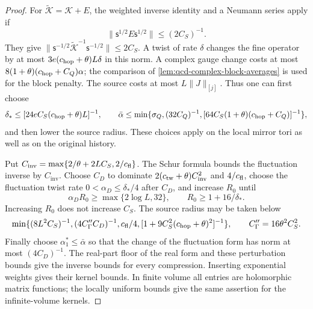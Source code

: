 \documentclass[11pt,letterpaper,reqno]{amsart}
\theoremstyle{definition}
\theoremstyle{remark}
\begin{document}
\begin{proof}
For $\widetilde{\mathcal K}=\mathcal K+E$, the weighted inverse
identity and a Neumann series apply if
\[
 \|\mathsf s^{1/2}E\mathsf s^{1/2}\|\le(2C_S)^{-1}.
\]
They give $\|\mathsf s^{-1/2}\widetilde{\mathcal K}^{-1}
\mathsf s^{-1/2}\|\le2C_S$.  A twist of rate $\delta$ changes
the fine operator by at most
$3e(c_{\rm hop}+\theta)L\delta$ in this norm.  A complex gauge
change costs at most
$8(1+\theta)(c_{\rm hop}+C_Q)\alpha$; the comparison of
\cref{lem:qcd-complex-block-averages} is used for the block penalty.  The source costs
at most $L\|J\|_{[j]}$.  Thus one can first choose
\[
 \delta_*\le[24eC_S(c_{\rm hop}+\theta)L]^{-1},\qquad
 \bar\alpha\le\min\{\sigma_Q,(32C_Q)^{-1},
       [64C_S(1+\theta)(c_{\rm hop}+C_Q)]^{-1}\},
\]
and then lower the source radius.  These choices apply on the local
mirror tori as well as on the original history.

Put $C_{\mathrm{inv}}=\max\{2/\theta+2LC_S,2/c_{\rm fl}\}$.
The Schur formula bounds the fluctuation inverse by $C_{\mathrm{inv}}$.
Choose $C_D$ to dominate $2(c_{\rm tw}+\theta)C_{\mathrm{inv}}^2$
and $4/c_{\rm fl}$, choose the fluctuation twist rate
$0<\alpha_D\le\delta_*/4$ after $C_D$, and increase $R_0$ until
\[
 \alpha_DR_0\ge\max\{2\log L,32\},\qquad
 R_0\ge1+16/\delta_*.
\]
Increasing $R_0$ does not increase $C_S$.  The source radius may be
taken below
\[
 \min\{(8L^2C_S)^{-1},(4C''_\Gamma C_D)^{-1},
 c_{\rm fl}/4,[1+9C_S^2(c_{\rm hop}+\theta)^2]^{-1}\},
 \qquad C''_\Gamma=16\theta^2C_S^2.
\]
Finally choose $\alpha_1^*\le\bar\alpha$ so that the change of
the fluctuation form has norm at most $(4C_D)^{-1}$.
The real-part floor of the real form and these perturbation bounds
give the inverse bounds for every compression.  Inserting exponential
weights gives their kernel bounds.  In finite volume all entries
are holomorphic matrix functions; the locally uniform bounds give
the same assertion for the infinite-volume kernels.
\end{proof}
\end{document}
